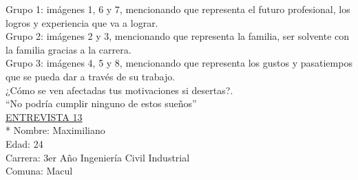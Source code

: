 Grupo 1: imágenes 1, 6 y 7, mencionando que representa el futuro profesional, los logros y experiencia que va a lograr.\\

Grupo 2: imágenes 2 y 3, mencionando que representa la familia, ser solvente con la familia gracias a la carrera.\\

Grupo 3: imágenes 4, 5 y 8, mencionando que representa los gustos y pasatiempos que se pueda dar a través de su trabajo.\\

¿Cómo se ven afectadas tus motivaciones si desertas?.\\

``No podría cumplir ninguno de estos sueños''\\


\underline {ENTREVISTA 13}\\*
Nombre: Maximiliano\\
Edad: 24\\
Carrera: 3er Año Ingeniería Civil Industrial\\
Comuna: Macul\\

